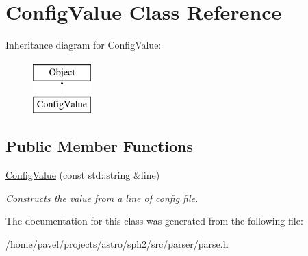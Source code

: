 \hypertarget{classConfigValue}{}\section{Config\+Value Class Reference}
\label{classConfigValue}
Inheritance diagram for Config\+Value\+:\begin{figure}[H]
\begin{center}
\leavevmode
\includegraphics[height=2.000000cm]{classConfigValue}
\end{center}
\end{figure}
\subsection*{Public Member Functions}
\begin{DoxyCompactItemize}
\item 
\hypertarget{classConfigValue_a609063f010e809bbfe0ba17169e73d0a}{}\label{classConfigValue_a609063f010e809bbfe0ba17169e73d0a} 
\hyperlink{classConfigValue_a609063f010e809bbfe0ba17169e73d0a}{Config\+Value} (const std\+::string \&line)
\begin{DoxyCompactList}\small\item\em Constructs the value from a line of config file. \end{DoxyCompactList}\end{DoxyCompactItemize}


The documentation for this class was generated from the following file\+:\begin{DoxyCompactItemize}
\item 
/home/pavel/projects/astro/sph2/src/parser/parse.\+h\end{DoxyCompactItemize}
